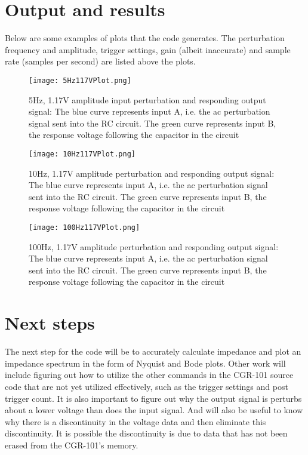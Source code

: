 \chapter{Output and results}
Below are some examples of plots that the code generates. The perturbation frequency and amplitude, trigger settings, gain (albeit inaccurate) and sample rate (samples per second) are listed above the plots.
\begin{figure}[H]
\texttt{[image: 5Hz117VPlot.png]}
\caption{5Hz, 1.17V amplitude input perturbation and responding output signal: The blue curve represents input A, i.e. the ac perturbation signal sent into the RC circuit. The green curve represents input B, the response voltage following the capacitor in the circuit
\label{5Hz117VPlot}}
\end{figure}
%
\begin{figure}[H]
\texttt{[image: 10Hz117VPlot.png]}
\caption{10Hz, 1.17V amplitude perturbation and responding output signal: The blue curve represents input A, i.e. the ac perturbation signal sent into the RC circuit. The green curve represents input B, the response voltage following the capacitor in the circuit
\label{10Hz117VPlot}}
\end{figure}
%
\begin{figure}[H]
\texttt{[image: 100Hz117VPlot.png]}
\caption{100Hz, 1.17V amplitude perturbation and responding output signal: The blue curve represents input A, i.e. the ac perturbation signal sent into the RC circuit. The green curve represents input B, the response voltage following the capacitor in the circuit
\label{100Hz117VPlot}}
\end{figure}
\chapter{Next steps}
%
The next step for the code will be to accurately calculate impedance and plot an impedance spectrum in the form of Nyquist and Bode plots. Other work will include figuring out how to utilize the other commands in the CGR-101 source code that are not yet utilized effectively, such as the trigger settings and post trigger count. It is also important to figure out why the output signal is perturbs about a lower voltage than does the input signal. And will also be useful to know why there is a discontinuity in the voltage data and then eliminate this discontinuity. It is possible the discontinuity is due to data that has not been erased from the CGR-101's memory.

